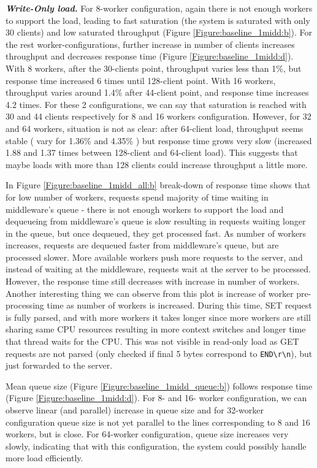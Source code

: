 \documentclass[11pt,a4paper]{article}
\begin{document}
\textit{\textbf{Write-Only load.}} For 8-worker configuration, again there is not enough workers to support the load, leading to fast saturation (the system is saturated with only 30 clients) and low saturated throughput (Figure \ref{Figure:baseline_1midd:b}). For the rest worker-configurations, further increase in number of clients increases throughput and decreases response time (Figure \ref{Figure:baseline_1midd:d}). With 8 workers, after the 30-clients point, throughput varies less than 1\%, but response time increased 6 times until 128-client point. With 16 workers, 	throughput varies around 1.4\% after 44-client point, and response time increases 4.2 times. For these 2 configurations, we can say that saturation is reached with 30 and 44 clients respectively for 8 and 16 workers configuration. However, for 32 and 64 workers, situation is not as clear: after 64-client load, throughput seems stable ( vary for 1.36\% and 4.35\% ) but response time grows very slow (increased 1.88 and 1.37 times between 128-client and 64-client load). This suggests that maybe loads with more than 128 clients could increase throughput a little more.

In Figure \ref{Figure:baseline_1midd_all:b} break-down of response time shows that for low number of workers, requests spend majority of time waiting in middleware's queue - there is not enough workers to support the load and dequeueing from middleware's queue is slow resulting in requests waiting longer in the queue, but once dequeued, they get processed fast. As number of workers increases, requests are dequeued faster from middleware's queue, but are processed slower. More available workers push more requests to the server, and instead of waiting at the middleware, requests wait at the server to be processed. However, the response time still decreases with increase in number of workers. Another interesting thing we can observe from this plot is increase of worker pre-processing time as number of workers is increased. During this time, SET request is fully parsed, and with more workers it takes longer since more workers are still sharing same CPU resources resulting in more context switches and longer time that thread waits for the CPU. This was not visible in read-only load as GET requests are not parsed (only checked if final 5 bytes correspond to \texttt{END\textbackslash r\textbackslash n}), but just forwarded to the server.

Mean queue size (Figure \ref{Figure:baseline_1midd_queue:b}) follows response time (Figure \ref{Figure:baseline_1midd:d}). For 8- and 16- worker configuration, we can observe linear (and parallel) increase in queue size and for 32-worker configuration queue size is not yet parallel to the lines corresponding to 8 and 16 workers, but is close. For 64-worker configuration, queue size increases very slowly, indicating that with this configuration, the system could possibly handle more load efficiently.
\end{document}
